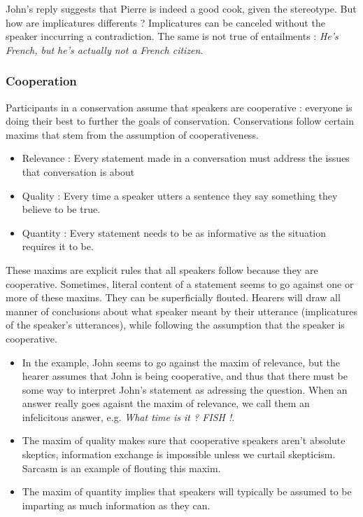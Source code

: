 \documentclass{cours}
\begin{document}
John's reply suggests that Pierre is indeed a good cook, given the stereotype. But how are implicatures differents ? Implicatures can be canceled without the speaker inccurring a contradiction. The same is not true of entailments\! : \textsl{He's French, but he's actually not a French citizen}.

\subsubsection{Cooperation}
\begin{proposition}
    Participants in a conservation assume that speakers are cooperative\! : everyone is doing their best to further the goals of conservation. Conservations follow certain maxims that stem from the assumption of cooperativeness.

\begin{itemize}
    \item Relevance\! : Every statement made in a conversation must address the issues that conversation is about
    \item Quality\! : Every time a speaker utters a sentence they say something they believe to be true.
    \item Quantity\! : Every statement needs to be as informative as the situation requires it to be. 
\end{itemize}
\end{proposition}

These maxims are explicit rules that all speakers follow because they are cooperative. Sometimes, literal content of a statement seems to go against one or more of these maxims. They can be superficially flouted. Hearers will draw all manner of conclusions about what speaker meant by their utterance (implicatures of the speaker's utterances), while following the assumption that the speaker is cooperative. 

\begin{itemize}
    \item In the example, John seems to go against the maxim of relevance, but the hearer assumes that John is being cooperative, and thus that there must be some way to interpret John's statement as adressing the question. When an answer really goes agaisnt the maxim of relevance, we call them an infelicitous answer, e.g. \textsl{What time is it ? FISH !}.
    \item The maxim of quality makes sure that cooperative speakers aren't absolute skeptics, information exchange is impossible unless we curtail skepticism. Sarcasm is an example of flouting this maxim. 
    \item The maxim of quantity implies that speakers will typically be assumed to be imparting as much information as they can.   
\end{itemize}
\end{document}
